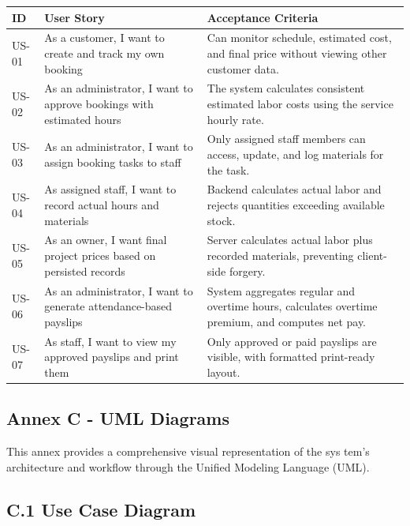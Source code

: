 \documentclass[12pt, letterpaper]{article}
\begin{document}
\begin{table}[h]
\centering
\small

\begin{tabular}{p{1.8cm} p{5.5cm} p{6.7cm}}
\toprule
\textbf{ID} & \textbf{User Story} & \textbf{Acceptance Criteria}  \\
\midrule
US-01 & As a customer, I want to create and track my own booking & Can monitor schedule, estimated cost, and final price without viewing other customer data. \\
US-02 & As an administrator, I want to approve bookings with estimated hours & The system calculates consistent estimated labor costs using the service hourly rate. \\
US-03 & As an administrator, I want to assign booking tasks to staff & Only assigned staff members can access, update, and log materials for the task. \\
US-04 & As assigned staff, I want to record actual hours and materials & Backend calculates actual labor and rejects quantities exceeding available stock. \\
US-05 & As an owner, I want final project prices based on persisted records & Server calculates actual labor plus recorded materials, preventing client-side forgery. \\
US-06 & As an administrator, I want to generate attendance-based payslips & System aggregates regular and overtime hours, calculates overtime premium, and computes net pay. \\
US-07 & As staff, I want to view my approved payslips and print them & Only approved or paid payslips are visible, with formatted print-ready layout. \\
\bottomrule
\end{tabular}
\end{table}


\newpage

\subsection*{Annex C - UML Diagrams}
\hspace*{2em }This annex provides a comprehensive visual representation of the sys
tem’s architecture and workflow through the Unified Modeling Language 
(UML).
\newpage
\subsection*{C.1 Use Case Diagram}
\vspace*{\fill}
\end{document}

